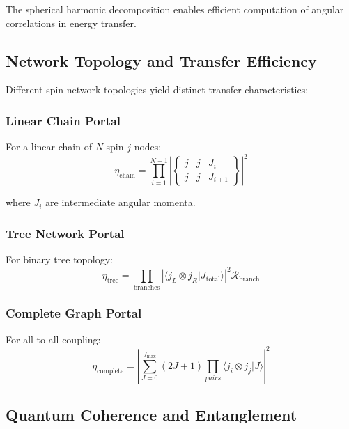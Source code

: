 \documentclass[12pt]{article}
\begin{document}
The spherical harmonic decomposition enables efficient computation of angular correlations in energy transfer.

\subsection{Network Topology and Transfer Efficiency}

Different spin network topologies yield distinct transfer characteristics:

\subsubsection{Linear Chain Portal}
For a linear chain of $N$ spin-$j$ nodes:
\begin{equation}
\eta_{\text{chain}} = \prod_{i=1}^{N-1} \left|\begin{Bmatrix} j & j & J_i \\ j & j & J_{i+1} \end{Bmatrix}\right|^2
\end{equation}

where $J_i$ are intermediate angular momenta.

\subsubsection{Tree Network Portal}
For binary tree topology:
\begin{equation}
\eta_{\text{tree}} = \prod_{\text{branches}} \left|\langle j_L \otimes j_R | J_{\text{total}} \rangle\right|^2 \mathcal{R}_{\text{branch}}
\end{equation}

\subsubsection{Complete Graph Portal}
For all-to-all coupling:
\begin{equation}
\eta_{\text{complete}} = \left|\sum_{J=0}^{J_{\max}} (2J+1) \prod_{pairs} \langle j_i \otimes j_j | J \rangle\right|^2
\end{equation}

\subsection{Quantum Coherence and Entanglement}
\end{document}
